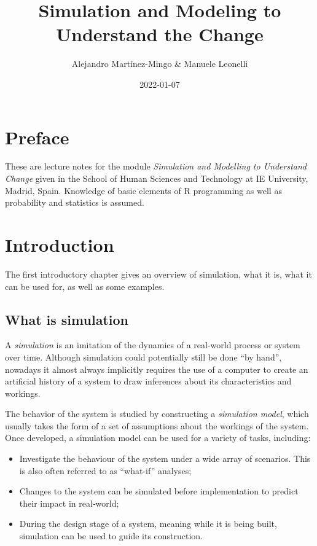 \documentclass[
]{book}
\title{Simulation and Modeling to Understand the Change}
\author{Alejandro Martínez-Mingo \& Manuele Leonelli}
\date{2022-01-07}
\begin{document}
\maketitle

{
\setcounter{tocdepth}{1}
\tableofcontents
}
\hypertarget{preface}{%
\chapter*{Preface}\label{preface}}

These are lecture notes for the module \emph{Simulation and Modelling to Understand Change} given in the School of Human Sciences and Technology at IE University, Madrid, Spain. Knowledge of basic elements of R programming as well as probability and statistics is assumed.

\hypertarget{intro}{%
\chapter{Introduction}\label{intro}}

The first introductory chapter gives an overview of simulation, what it is, what it can be used for, as well as some examples.

\hypertarget{what-is-simulation}{%
\section{What is simulation}\label{what-is-simulation}}

A \emph{simulation} is an imitation of the dynamics of a real-world process or system over time. Although simulation could potentially still be done ``by hand'', nowadays it almost always implicitly requires the use of a computer to create an artificial history of a system to draw inferences about its characteristics and workings.

The behavior of the system is studied by constructing a \emph{simulation model}, which usually takes the form of a set of assumptions about the workings of the system. Once developed, a simulation model can be used for a variety of tasks, including:

\begin{itemize}
\item
  Investigate the behaviour of the system under a wide array of scenarios. This is also often referred to as ``what-if'' analyses;
\item
  Changes to the system can be simulated before implementation to predict their impact in real-world;
\item
  During the design stage of a system, meaning while it is being built, simulation can be used to guide its construction.
\end{itemize}
\end{document}
